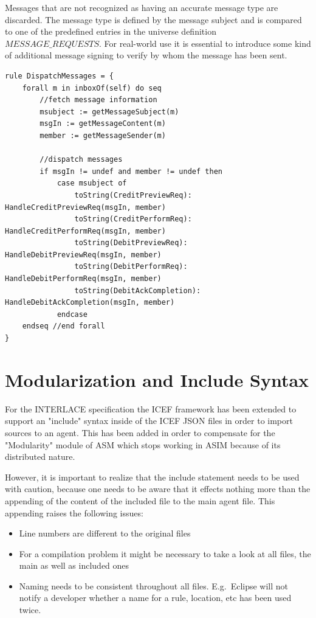 Messages that are not recognized as having an accurate message type are discarded. The message type is defined by the message subject and is compared to one of the predefined entries in the universe definition $MESSAGE\_REQUESTS$. For real-world use it is essential to introduce some kind of additional message signing to verify by whom the message has been sent.

\begin{center}
\begin{minipage}{0.8\textwidth}
\small
\begin{lstlisting}[language=bsl_lst,caption={\bf\small Server message dispatching},label={lst:impl-msg-dispatch} ]
rule DispatchMessages = {
	forall m in inboxOf(self) do seq
		//fetch message information
		msubject := getMessageSubject(m)
		msgIn := getMessageContent(m)
		member := getMessageSender(m)
		
		//dispatch messages
		if msgIn != undef and member != undef then
			case msubject of
				toString(CreditPreviewReq): HandleCreditPreviewReq(msgIn, member)
				toString(CreditPerformReq): HandleCreditPerformReq(msgIn, member)
				toString(DebitPreviewReq): HandleDebitPreviewReq(msgIn, member)
				toString(DebitPerformReq): HandleDebitPerformReq(msgIn, member)
				toString(DebitAckCompletion): HandleDebitAckCompletion(msgIn, member)
			endcase
	endseq //end forall
}
\end{lstlisting}
\end{minipage}
\end{center}

\section{Modularization and Include Syntax}
\label{sec:impl-include}

For the INTERLACE specification the ICEF framework has been extended to support an "include" syntax inside of the ICEF JSON files in order to import sources to an agent. This has been added in order to compensate for the "Modularity" module of ASM which stops working in ASIM because of its distributed nature.

However, it is important to realize that the include statement needs to be used with caution, because one needs to be aware that it effects nothing more than the appending of the content of the included file to the main agent file. This appending raises the following issues:

\begin{itemize}
	\item Line numbers are different to the original files
	\item For a compilation problem it might be necessary to take a look at all files, the main as well as included ones
	\item Naming needs to be consistent throughout all files. E.g.\ Eclipse will not notify a developer whether a name for a rule, location, etc has been used twice.
\end{itemize}

